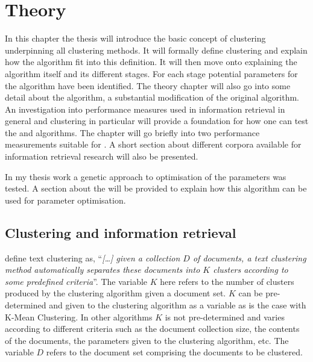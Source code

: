 
\chapter{Theory} %
\label{Theory} %

In this chapter the thesis will introduce the basic concept of clustering underpinning all clustering methods. It will formally define clustering and explain how the \STC algorithm fit into this definition. It will then move onto explaining the \STC algorithm itself and its different stages. For each stage potential parameters for the algorithm have been identified. The theory chapter will also go into some detail about the \CTC algorithm, a substantial modification of the original \STC algorithm. An investigation into performance measures used in information retrieval in general and clustering in particular will provide a foundation for how one can test the \STC and \CTC algorithms. The chapter will go briefly into two performance measurements suitable for \CTC. A short section about different corpora available for information retrieval research will also be presented.

In my thesis work a genetic approach to optimisation of the parameters was tested. A section about the \GA will be provided to explain how this algorithm can be used for parameter optimisation.

\section{Clustering and information retrieval}
\label{Clustering}
\citeauthor[][286]{Baeza-Yates2011a} define text clustering as, ``\textit{[\dots] given a collection \(D\) of documents, a text clustering method automatically separates these documents into \(K\) clusters according to some predefined criteria}''. The variable \(K\) here refers to the number of clusters produced by the clustering algorithm given a document set. \(K\) can be pre-determined and given to the clustering algorithm as a variable as is the case with K-Mean Clustering. In other algorithms \(K\) is not pre-determined and varies according to different criteria such as the document collection size, the contents of the documents, the parameters given to the clustering algorithm, etc. The variable \(D\) refers to the document set comprising the documents to be clustered.

